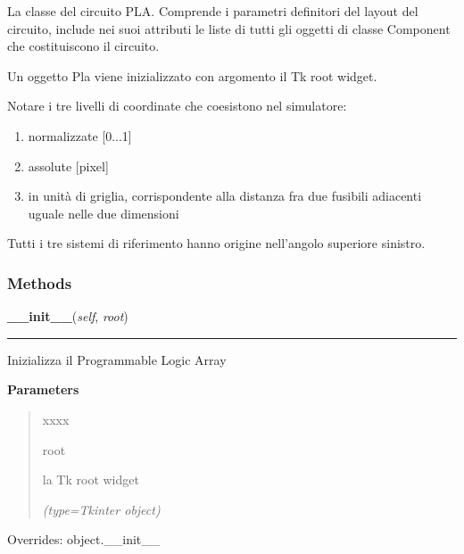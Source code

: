 La classe del circuito PLA. Comprende i parametri definitori del layout del
circuito, include nei suoi attributi le liste di tutti gli oggetti di 
classe Component che costituiscono il circuito.

Un oggetto Pla viene inizializzato con argomento il Tk root widget.

Notare i tre livelli di coordinate che coesistono nel simulatore:

\begin{enumerate}

\setlength{\parskip}{0.5ex}
  \item normalizzate [0...1]

  \item assolute [pixel]

  \item in unità di griglia, corrispondente alla distanza fra due fusibili 
    adiacenti uguale nelle due dimensioni

\end{enumerate}

Tutti i tre sistemi di riferimento hanno origine nell'angolo superiore 
sinistro.



  \subsubsection{Methods}

    \vspace{0.5ex}

\hspace{.8\funcindent}\begin{boxedminipage}{\funcwidth}

    \raggedright \textbf{\_\_init\_\_}(\textit{self}, \textit{root})

    \vspace{-1.5ex}

    \rule{\textwidth}{0.5\fboxrule}
\setlength{\parskip}{2ex}
    Inizializza il Programmable Logic Array

\setlength{\parskip}{1ex}
      \textbf{Parameters}
      \vspace{-1ex}

      \begin{quote}
        \begin{Ventry}{xxxx}

          \item[root]

          la Tk root widget

            {\it (type=Tkinter object)}

        \end{Ventry}

      \end{quote}

      Overrides: object.\_\_init\_\_

    \end{boxedminipage}

